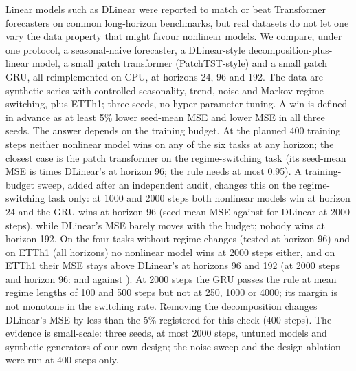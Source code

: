 Linear models such as DLinear were reported to match or beat Transformer forecasters on common long-horizon benchmarks, but real datasets do not let one vary the data property that might favour nonlinear models. We compare, under one protocol, a seasonal-naive forecaster, a DLinear-style decomposition-plus-linear model, a small patch transformer (PatchTST-style) and a small patch GRU, all reimplemented on CPU, at horizons 24, 96 and 192. The data are synthetic series with controlled seasonality, trend, noise and Markov regime switching, plus ETTh1; three seeds, no hyper-parameter tuning. A win is defined in advance as at least 5\% lower seed-mean MSE and lower MSE in all three seeds. The answer depends on the training budget. At the planned 400 training steps neither nonlinear model wins on any of the six tasks at any horizon; the closest case is the patch transformer on the regime-switching task (its seed-mean MSE is  times DLinear's at horizon 96; the rule needs at most 0.95). A training-budget sweep, added after an independent audit, changes this on the regime-switching task only: at 1000 and 2000 steps both nonlinear models win at horizon 24 and the GRU wins at horizon 96 (seed-mean MSE  against  for DLinear at 2000 steps), while DLinear's MSE barely moves with the budget; nobody wins at horizon 192. On the four tasks without regime changes (tested at horizon 96) and on ETTh1 (all horizons) no nonlinear model wins at 2000 steps either, and on ETTh1 their MSE stays above DLinear's at horizons 96 and 192 (at 2000 steps and horizon 96:  and  against ). At 2000 steps the GRU passes the rule at mean regime lengths of 100 and 500 steps but not at 250, 1000 or 4000; its margin is not monotone in the switching rate. Removing the decomposition changes DLinear's MSE by less than the 5\% registered for this check (400 steps). The evidence is small-scale: three seeds, at most 2000 steps, untuned models and synthetic generators of our own design; the noise sweep and the design ablation were run at 400 steps only.
